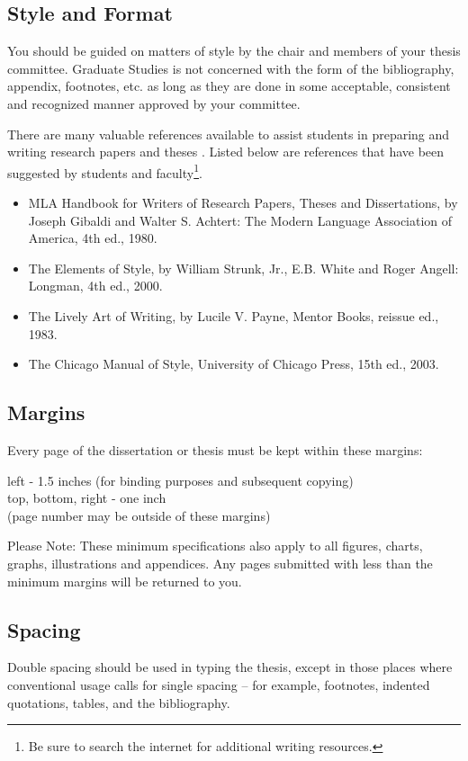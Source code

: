 \subsection{Style and Format}
%
You should be guided on matters of style by the chair and members of your thesis committee. Graduate Studies is not concerned with the form of the bibliography, appendix, footnotes, etc. as long as they are done in some acceptable, consistent and recognized manner approved by your committee.

There are many valuable references available to assist students in preparing and writing research papers and theses \cite{Gibaldi:80, Strunk:00, UoCPress:03}. Listed below are references that have been suggested by students and faculty\footnote{Be sure to search the internet for additional writing resources.}.
%
\begin{itemize}
\item MLA Handbook for Writers of Research Papers, Theses and Dissertations, by Joseph Gibaldi
    and Walter S. Achtert: The Modern Language Association of America, 4th ed., 1980.
\item The Elements of Style, by William Strunk, Jr., E.B. White and Roger Angell: Longman, 4th ed., 2000.
\item The Lively Art of Writing, by Lucile V. Payne, Mentor Books, reissue ed., 1983.
\item The Chicago Manual of Style, University of Chicago Press, 15th ed., 2003.
\end{itemize}

\subsection{Margins}
%
Every page of the dissertation or thesis must be kept within these margins:

\noindent left - 1.5 inches (for binding purposes and subsequent copying)\\
top, bottom, right - one inch\\
(page number may be outside of these margins)

Please Note: These minimum specifications also apply to all figures, charts, graphs, illustrations and appendices. Any pages submitted with less than the minimum margins will be returned to you.

\subsection{Spacing}
%
Double spacing should be used in typing the thesis, except in those places where conventional usage calls for single spacing -- for example, footnotes, indented quotations, tables, and the bibliography.

